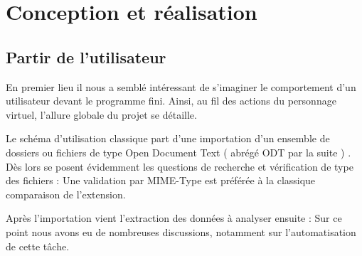 \section{Conception et réalisation}

\subsection{Partir de l'utilisateur}

En premier lieu il nous a semblé intéressant de s'imaginer le comportement d'un utilisateur devant le programme fini. Ainsi, au fil des actions du personnage virtuel,
l'allure globale du projet se détaille.  

Le schéma d'utilisation classique part d'une importation d'un ensemble de dossiers ou fichiers de type Open Document Text ( abrégé ODT par la suite ) . Dès lors se posent évidemment les questions de recherche et vérification de type des fichiers : Une validation par MIME-Type est préférée à la classique comparaison de l'extension.

Après l'importation vient l'extraction des données à analyser ensuite : Sur ce point nous avons eu de nombreuses discussions, notamment sur l'automatisation de cette tâche.









